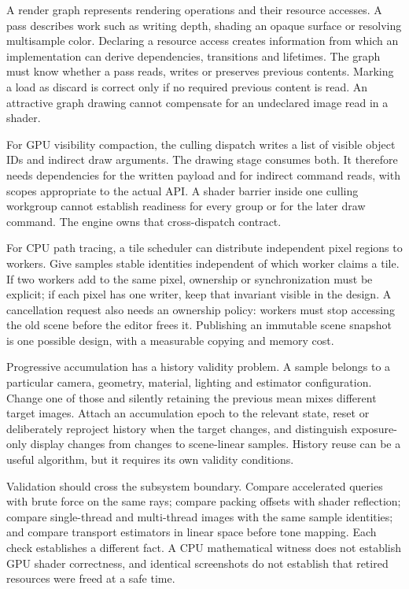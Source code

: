 A render graph represents rendering operations and their resource accesses. A pass describes work such as writing depth, shading an opaque surface or resolving multisample color. Declaring a resource access creates information from which an implementation can derive dependencies, transitions and lifetimes. The graph must know whether a pass reads, writes or preserves previous contents. Marking a load as discard is correct only if no required previous content is read. An attractive graph drawing cannot compensate for an undeclared image read in a shader.

For GPU visibility compaction, the culling dispatch writes a list of visible object IDs and indirect draw arguments. The drawing stage consumes both. It therefore needs dependencies for the written payload and for indirect command reads, with scopes appropriate to the actual API. A shader barrier inside one culling workgroup cannot establish readiness for every group or for the later draw command. The engine owns that cross-dispatch contract.

For CPU path tracing, a tile scheduler can distribute independent pixel regions to workers. Give samples stable identities independent of which worker claims a tile. If two workers add to the same pixel, ownership or synchronization must be explicit; if each pixel has one writer, keep that invariant visible in the design. A cancellation request also needs an ownership policy: workers must stop accessing the old scene before the editor frees it. Publishing an immutable scene snapshot is one possible design, with a measurable copying and memory cost.

Progressive accumulation has a history validity problem. A sample belongs to a particular camera, geometry, material, lighting and estimator configuration. Change one of those and silently retaining the previous mean mixes different target images. Attach an accumulation epoch to the relevant state, reset or deliberately reproject history when the target changes, and distinguish exposure-only display changes from changes to scene-linear samples. History reuse can be a useful algorithm, but it requires its own validity conditions.

Validation should cross the subsystem boundary. Compare accelerated queries with brute force on the same rays; compare packing offsets with shader reflection; compare single-thread and multi-thread images with the same sample identities; and compare transport estimators in linear space before tone mapping. Each check establishes a different fact. A CPU mathematical witness does not establish GPU shader correctness, and identical screenshots do not establish that retired resources were freed at a safe time.

